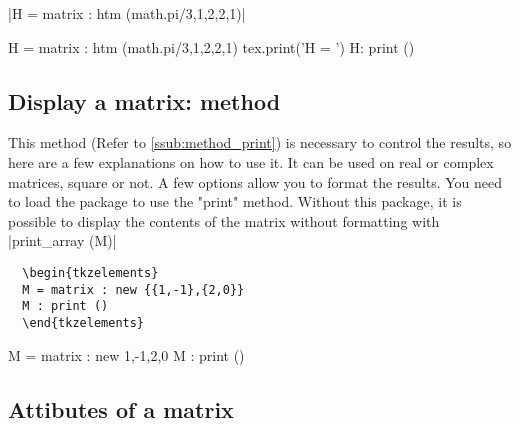 \begin{itemize}
\begin{minipage}{.5\textwidth}
  \begin{mybox}
  |H = matrix : htm (math.pi/3,1,2,2,1)| 
  \end{mybox}
  \end{minipage}
\begin{minipage}{.5\textwidth}
  \begin{tkzelements}
  H = matrix : htm (math.pi/3,1,2,2,1)
   tex.print('H = ') H: print ()
  \end{tkzelements}
  \end{minipage}
  
\end{itemize}

\subsection{Display a matrix: method } %
\label{sub:display_a_matrix_method_print}


This method (Refer to \ref{ssub:method_print}) is necessary to control the results, so here are a few explanations on how to use it. It can be used on real or complex matrices, square or not. A few options allow you to format the results. You need to load the  package to use the "print" method. Without this package, it is possible to display the contents of the matrix without formatting with |print_array (M)|

\begin{minipage}{.5\textwidth}
\begin{Verbatim}
  \begin{tkzelements}
  M = matrix : new {{1,-1},{2,0}}
  M : print ()
  \end{tkzelements}
\end{Verbatim}
\end{minipage}
\begin{minipage}{.5\textwidth}
  \begin{tkzelements}
  M = matrix : new {{1,-1},{2,0}}
  M : print ()
  \end{tkzelements}
\end{minipage}




\subsection{Attibutes of a matrix} %
\label{sub:attibutes_of_a_matrix}



